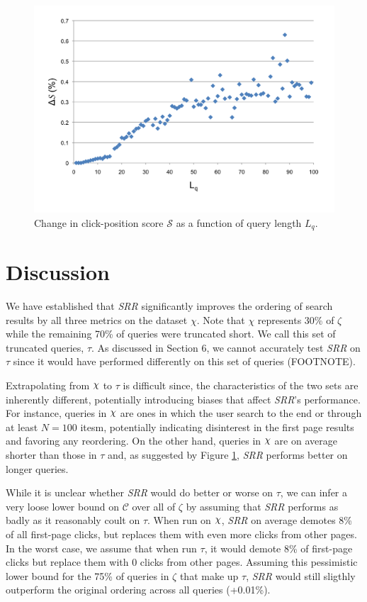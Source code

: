\documentclass{article}
\def\Chi{\raisebox{2pt}{$\chi$}}
\begin{document}
\begin{figure}[htbp!]
    \centering
    \includegraphics[width=\textwidth]{scorebylen.png}
    \caption{Change in click-position score $\mathscr{S}$ as a function of query length $L_q$.}
    \label{fig:click_position_score_vs_query_length}
\end{figure}

\section{Discussion}

We have established that {\em SRR} significantly improves the ordering
of search results by all three metrics on the dataset $\chi$. Note that $\chi$
represents 30\% of $\zeta$ while the remaining 70\% of queries were truncated
short. We call this set of truncated queries, $\tau$. As discussed in Section 6, 
we cannot accurately test {\em SRR} on $\tau$ since it would have performed 
differently on this set of queries (FOOTNOTE).

Extrapolating from $\Chi$ to $\tau$ is difficult since, the characteristics of
the two sets are inherently different, potentially introducing biases that
affect {\em SRR}'s performance. For instance, queries in $\Chi$ are ones in
which the user search to the end or through at least $N=100$ itesm, potentially
indicating disinterest in the first page results and favoring any reordering. On
the other hand, queries in $\Chi$ are on average shorter than those in $\tau$
and, as suggested by Figure \ref{fig:click_position_score_vs_query_length}, {\em SRR}
performs better on longer queries. 

While it is unclear whether {\em SRR} would do better or worse on $\tau$, we can
infer a very loose lower bound on $\mathscr{C}$ over all of $\zeta$ by assuming
that {\em SRR} performs as badly as it reasonably coult on $\tau$. When run on
$\Chi$, {\em SRR} on average demotes 8\% of all first-page clicks, but replaces
them with even more clicks from other pages. In the worst case, we assume that
when run $\tau$, it would demote 8\% of first-page clicks but replace them with
0 clicks from other pages. Assuming this pessimistic lower bound for the 75\% of 
queries in $\zeta$ that make up $\tau$, {\em SRR} would still sligthly
outperform the original ordering across all queries (+0.01\%).
\end{document}
